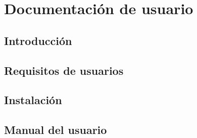 \chapter{Documentación de usuario}
\label{cha:Documentación de usuario}

\section{Introducción}

\section{Requisitos de usuarios}

\section{Instalación}

\section{Manual del usuario}
